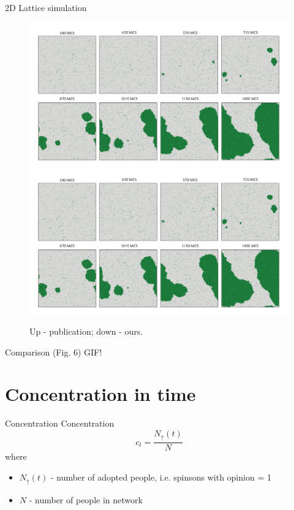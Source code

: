 \documentclass[10pt]{beamer}
\begin{document}
\begin{frame}{2D Lattice simulation}
	\begin{figure}
		\includegraphics[height=0.4\textheight]{../resources/images/fig6.png}
		\hfill
		\includegraphics[height=0.4\textheight]{../resources/images/fig6.png}
		\caption{Up - publication; down - ours.}
	\end{figure}
	Comparison (Fig. 6)
	GIF!
\end{frame}

\section{Concentration in time}

\begin{frame}{Concentration}
	Concentration
	$$ c_t = \frac{N_{\uparrow}(t)}{N} $$ 
	where 
	\begin{itemize}
		\item $ N_{\uparrow}(t) $ - number of adopted people, i.e. spinsons with opinion = 1
		\item $ N $ - number of people in network
	\end{itemize}

\end{frame}
\end{document}
